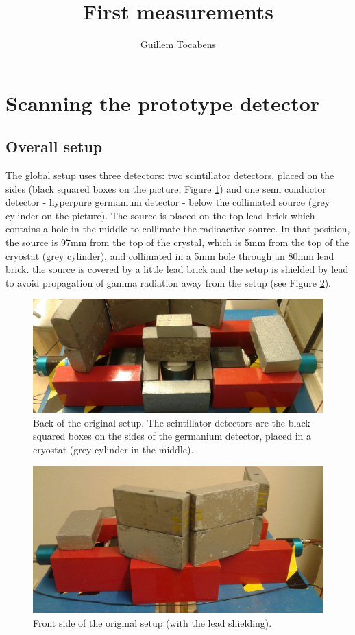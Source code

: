\documentclass[11pt,a4paper]{article}
\author{Guillem Tocabens}
\title{First measurements}
\begin{document}
\section{Scanning the prototype detector}

\subsection{Overall setup}

The global setup uses three detectors: two scintillator detectors, placed on the sides (black squared boxes on the picture, Figure \ref{Setup}) and one semi conductor detector - hyperpure germanium detector - below the collimated source (grey cylinder on the picture). The source is placed on the top lead brick which contains a hole in the middle to collimate the radioactive source. In that position, the source is 97mm from the top of the crystal, which is 5mm from the top of the cryostat (grey cylinder), and collimated in a 5mm hole through an 80mm lead brick. the source is covered by a little lead brick and the setup is shielded by lead to avoid propagation of gamma radiation away from the setup (see Figure \ref{Setup_front}).

\begin{figure}[!h]
\centering
\includegraphics[scale=0.15]{New_setup_back.jpg}
\caption{Back of the original setup. The scintillator detectors are the black squared boxes on the sides of the germanium detector, placed in a cryostat (grey cylinder in the middle).}
\label{Setup}
\end{figure}

\begin{figure}[!h]
\centering
\includegraphics[scale=0.15]{New_setup_front.jpg}
\caption{Front side of the original setup (with the lead shielding).}
\label{Setup_front}
\end{figure}
\end{document}
